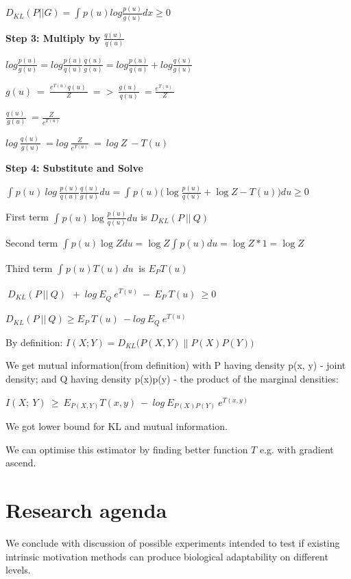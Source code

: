 $D_{KL}(P || G)  =  \int_{}^{}p(u) log \frac{p(u)}{g(u)}dx \geq 0$

\textbf{Step 3: Multiply by} $\frac{q(u)\ }{q(u)}$

$log \frac{p(u)}{g(u)} =  log \frac{p(u)}{q(u)}  \frac{q(u)}{g(u)} =  log \frac{p(u)}{q(u)} + log \frac{q(u)}{g(u)}$

$g(u)\  = \ \frac{e^{T(u)}q(u)\ }{Z}\  = > \ \frac{g(u)\ }{q(u)}\  = \frac{e^{T(u)}\ }{Z}\ $

$\frac{q(u)\ }{g(u)}\  = \frac{Z}{e^{T(u)}}$

$log\ \frac{q(u)\ }{g(u)}\  = log\ \frac{Z}{e^{T(u)}}\  = \ log\ Z\  - T(u)\ $

\textbf{Step 4: Substitute and Solve}

$\int_{}^{}p(u)\ log\ \frac{p(u)}{q(u)}\frac{q(u) }{g(u)}du  = \int_{}^{}p(u) \big( \log \frac{p(u)}{q(u)}  + \log Z - T(u) \big) du  \geq 0 $

First term $\int_{}^{} p(u) \log \frac{p(u)}{q(u)}du$ is $D_{KL}(P\ ||\ Q)$

Second term $\int_{}^{}p(u) \log Z du  = \log Z \int_{}^{}p(u) du =  \log Z * 1  =  \log Z$

Third term $ \int_{}^{}p(u)T(u)\ du\ $ is $E_{P}T(u)$

$\ D_{KL}(P\ ||\ Q)\ \  + \ {log\ E}_{Q}\ e^{T(u)}\  - \ E_{P}\ T(u)\  \geq 0$

$D_{KL}(P\ ||\ Q) \geq E_{P}\ T(u)\  - log\ E_{Q}\ e^{T(u)}\ \ $

By definition:
$I(X;Y)=D_{KL}\big(P(X,Y)\parallel P(X)P(Y)\big)$

We get mutual information(from definition) with P having density p(x, y) - joint density; and Q having density p(x)p(y) - the product of the marginal densities:

$I(X;\ Y)\  \geq \ E_{P(X,Y)}T(x,y)\  - \ log\ E_{P(X)P(Y)}\ e^{T(x,y)}$

We got lower bound for KL and mutual information.

We can optimise this estimator by finding better function $T$ e.g. with gradient ascend.

\section{Research agenda}\label{experiments-options-to-try}

We conclude with discussion of possible experiments intended to test if existing intrinsic motivation methods can produce biological adaptability on different levels.

